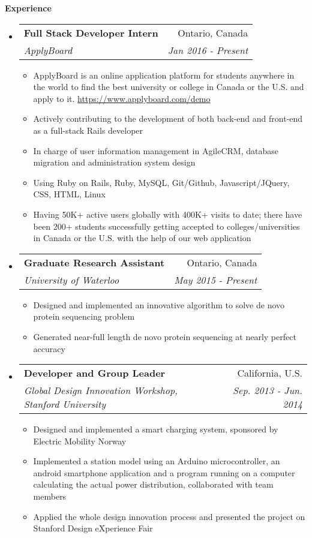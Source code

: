 \documentclass[letterpaper,10pt]{article}
\makeatletter
\newcommand{\resitem}[1]{\item #1 \vspace{-2pt}}
\newcommand{\resheading}[1]{{\large \colorbox{mygrey}{\begin{minipage}{\textwidth}{\textbf{#1 \vphantom{p\^{E}}}}\end{minipage}}}}
\newcommand{\ressubheading}[4]{
\begin{tabular*}{7.0in}{l@{\extracolsep{\fill}}r}
		\textbf{#1} & #2 \\
		\textit{#3} & \textit{#4} \\
\end{tabular*}\vspace{-6pt}}
\makeatother
\begin{document}
\resheading{Experience}
\begin{itemize}
\itemsep0em
\item 
	\ressubheading{Full Stack Developer Intern}{Ontario, Canada}{ApplyBoard}{Jan 2016 - Present}
	\begin{itemize}
		\resitem{ApplyBoard is an online application platform for students anywhere in the world to find the best university or college in Canada or the U.S. and apply to it. \url{https://www.applyboard.com/demo} }
		\resitem{Actively contributing to the development of both back-end and front-end as a full-stack Rails developer}
		\resitem{In charge of user information management in AgileCRM, database migration and administration system design}
		\resitem{Using Ruby on Rails, Ruby, MySQL, Git/Github, Javascript/JQuery, CSS, HTML, Linux}
        \resitem{Having 50K+ active users globally with 400K+ visits to date; there have been 200+ students successfully getting accepted to colleges/universities in Canada or the U.S. with the help of our web application }
	\end{itemize}

\item
	\ressubheading{Graduate Research Assistant}{Ontario, Canada}{University of Waterloo}{May 2015 - Present}
	\begin{itemize}
		\resitem{Designed and implemented an innovative algorithm to solve de novo protein sequencing problem }
		\resitem{Generated near-full length de novo protein sequencing at nearly perfect accuracy}
	\end{itemize}
\item
	\ressubheading{Developer and Group Leader}{California, U.S.}{Global Design Innovation Workshop, Stanford University}{ Sep. 2013 - Jun. 2014}
	\begin{itemize}
		\resitem{Designed and implemented a smart charging system, sponsored by Electric Mobility Norway}
		\resitem {Implemented a station model using an Arduino microcontroller, an android smartphone application and a program running on a computer calculating the actual power distribution, collaborated with team members}
		\resitem{Applied the whole design innovation process and presented the project on Stanford Design eXperience Fair}
	\end{itemize}
\end{itemize}
\end{document}
